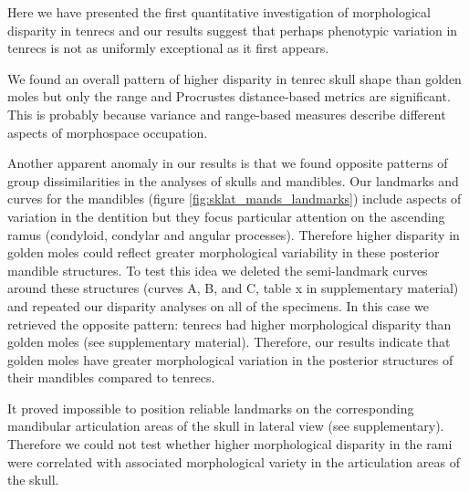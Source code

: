 \documentclass[12pt,a4paper]{article}
\begin{document}
	Here we have presented the first quantitative investigation of morphological disparity in tenrecs and our results suggest that perhaps phenotypic variation in tenrecs is not as uniformly exceptional as it first appears.





	We found an overall pattern of higher disparity in tenrec skull shape than golden moles but only the range and Procrustes distance-based metrics are significant. This is probably because variance and range-based measures describe different aspects of morphospace occupation. 




	
	Another apparent anomaly in our results is that we found opposite patterns of group dissimilarities in the analyses of skulls and mandibles. 
	Our landmarks and curves for the mandibles (figure \ref{fig:sklat_mands_landmarks}) include aspects of variation in the dentition but they focus particular attention on the ascending ramus (condyloid, condylar and angular processes). Therefore higher disparity in golden moles could reflect greater morphological variability in these posterior mandible structures. To test this idea we deleted the semi-landmark curves around these structures (curves A, B, and C, table x in supplementary material) and repeated our disparity analyses on all of the specimens. In this case we retrieved the opposite pattern: tenrecs had higher morphological disparity than golden moles (see supplementary material).
	Therefore, our results indicate that golden moles have greater morphological variation in the posterior structures of their mandibles compared to tenrecs.
		
 	It proved impossible to position reliable landmarks on the corresponding mandibular articulation areas of the skull in lateral view (see supplementary). Therefore we could not test whether higher morphological disparity in the rami were correlated with associated morphological variety in the articulation areas of the skull.
	
\end{document}

